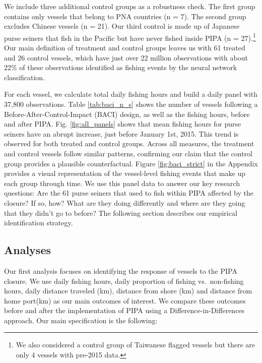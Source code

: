 \documentclass[9pttwoside,lineno]{pnas-new}
\begin{document}
We include three additional control groups as a
robustness check. The first group contains only vessels that belong to PNA countries (n
= 7). The second group excludes Chinese vessels (n = 21). Our third control
is made up of Japanese purse seiners that fish in the Pacific but have
never fished inside PIPA (n =
27).\footnote{We also considered a control group of Taiwanese flagged vessels but there are only 4 vessels with pre-2015 data.}
Our main definition of treatment and control groups leaves us with 61 treated and 26
control vessels, which have just over 22 million
observations with about 22\% of these observations identified as fishing events by the neural network classification.

For each vessel, we calculate total daily fishing hours and build a daily panel
with 37,800 observations. Table \ref{tab:baci_n_s} shows the number
of vessels following a Before-After-Control-Impact (BACI) design, as well as the fishing hours, before
and after PIPA. Fig. \ref{fig:all_panels} shows that mean fishing hours
for purse seiners have an abrupt increase, just before January 1st,
2015. This trend is observed for both treated and control groups. Across
all measures, the treatment and control vessels follow similar patterns,
confirming our claim that the control group provides a plausible
counterfactual. Figure \ref{fig:baci_strict} in the Appendix provides a visual
representation of the vessel-level fishing events that make up each
group through time. We use this panel data to answer our key research questions: 
Are the 61 purse seiners that used to fish within PIPA affected by the closure? If so, how?
What are they doing differently and where are they going that they didn't go to before?
The following section describes our empirical identification strategy.



\subsection{Analyses}\label{analyses}

Our first analysis focuses on identifying the response of 
vessels to the PIPA closure. We use daily fishing hours, daily proportion of fishing vs.~non-fishing
hours, daily distance traveled (km), distance from shore (km) and
distance from home
port(km) as our main outcomes of interest.
We compare these outcomes before and after the implementation
of PIPA using a Difference-in-Differences approach. Our main
specification is the following:
\end{document}
